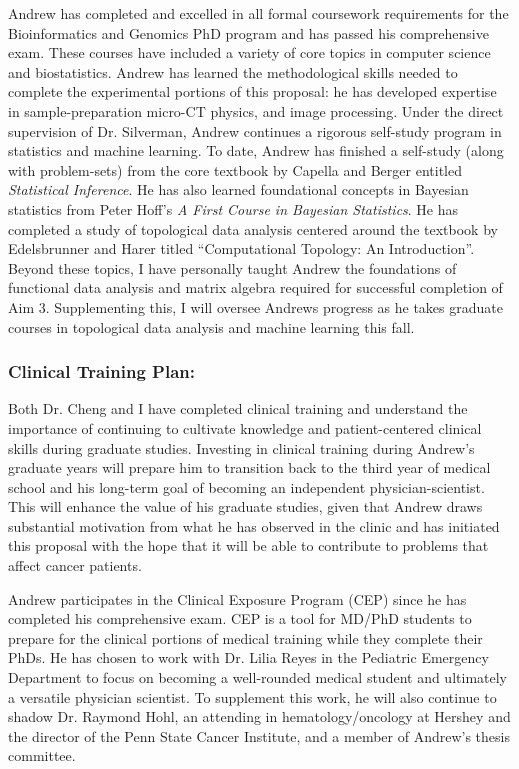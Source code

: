 \documentclass{NIHGrant}
\begin{document}
Andrew has completed and excelled in all formal coursework requirements for the Bioinformatics and Genomics PhD program and has passed his comprehensive exam. These courses have included a variety of core topics in computer science and biostatistics. Andrew has learned the methodological skills needed to complete the experimental portions of this proposal: he has developed expertise in sample-preparation micro-CT physics, and image processing. Under the direct supervision of Dr. Silverman, Andrew continues a rigorous self-study program in statistics and machine learning. To date, Andrew has finished a self-study (along with problem-sets) from the core textbook by Capella and Berger entitled \textit{Statistical Inference}. He has also learned foundational concepts in Bayesian statistics from Peter Hoff's \textit{A First Course in Bayesian Statistics}. He has completed a study of topological data analysis centered around the textbook by Edelsbrunner and Harer titled ``Computational Topology: An Introduction''. Beyond these topics, I have personally taught Andrew the foundations of functional data analysis and matrix algebra required for successful completion of Aim 3. Supplementing this, I will oversee Andrews progress as he takes graduate courses in topological data analysis and machine learning this fall.

\subsubsection*{Clinical Training Plan: }
Both Dr. Cheng and I have completed clinical training and understand the importance of continuing to cultivate knowledge and patient-centered clinical skills during graduate studies. Investing in clinical training during Andrew's graduate years will prepare him to transition back to the third year of medical school and his long-term goal of becoming an independent physician-scientist. This will enhance the value of his graduate studies, given that Andrew draws substantial motivation from what he has observed in the clinic and has initiated this proposal with the hope that it will be able to contribute to problems that affect cancer patients.

Andrew participates in the Clinical Exposure Program (CEP) since he has completed his comprehensive exam. CEP is a tool for MD/PhD students to prepare for the clinical portions of medical training while they complete their PhDs. He has chosen to work with Dr. Lilia Reyes in the Pediatric Emergency Department to focus on becoming a well-rounded medical student and ultimately a versatile physician scientist. To supplement this work, he will also continue to shadow Dr. Raymond Hohl, an attending in hematology/oncology at Hershey and the director of the Penn State Cancer Institute, and a member of Andrew's thesis committee.
\end{document}
